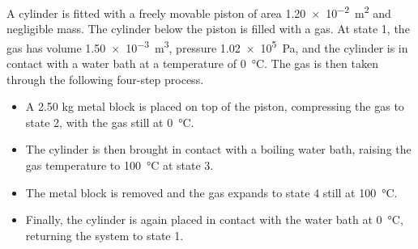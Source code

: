 \documentclass{../../../oss-ap12ibhl}
\begin{document}
\begin{questions}
  \question A cylinder is fitted with a freely movable piston of area
  \SI{1.20e-2}{\metre^2} and negligible mass. The cylinder below the piston is
  filled with a gas. At state 1, the gas has volume \SI{1.50e-3}{\metre^3},
  pressure \SI{1.02e5}{\pascal}, and the cylinder is in contact with a water
  bath at a temperature of \SI{0}{\celsius}. The gas is then taken through the
  following four-step process.
  \begin{itemize}
  \item A 2.50 kg metal block is placed on top of the piston, compressing the
    gas to state 2, with the gas still at \SI{0}{\celsius}.
  \item The cylinder is then brought in contact with a boiling water bath,
    raising the gas temperature to \SI{100}{\celsius} at state 3.
  \item The metal block is removed and the gas expands to state 4 still at
    \SI{100}{\celsius}.
  \item Finally, the cylinder is again placed in contact with the water bath at
    \SI{0}{\celsius}, returning the system to state 1.
  \end{itemize}
\end{questions}
\end{document}
